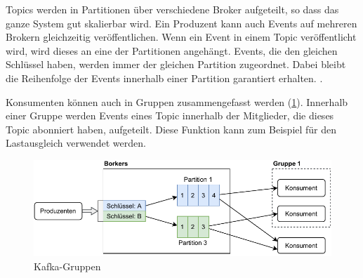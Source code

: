 Topics werden in Partitionen über verschiedene Broker aufgeteilt, so dass das ganze System gut skalierbar wird.
Ein Produzent kann auch Events auf mehreren Brokern gleichzeitig veröffentlichen.
Wenn ein Event in einem Topic veröffentlicht wird, wird dieses an eine der Partitionen angehängt.
Events, die den gleichen Schlüssel haben, werden immer der gleichen Partition zugeordnet.
Dabei bleibt die Reihenfolge der Events innerhalb einer Partition garantiert erhalten. \parencite{kafka-docs}.

Konsumenten können auch in Gruppen zusammengefasst werden (\cref{fig:kafka-gruppen}).
Innerhalb einer Gruppe werden Events eines Topic innerhalb der Mitglieder, die dieses Topic abonniert haben, aufgeteilt.
Diese Funktion kann zum Beispiel für den Lastausgleich verwendet werden.

\begin{figure}
    \centering
    \includegraphics{Grafiken/Grundlagen/Kafka-Gruppen.pdf}
    \caption{Kafka-Gruppen}
    \label{fig:kafka-gruppen}
\end{figure}
